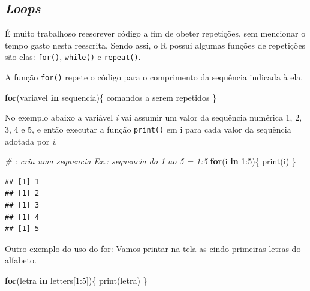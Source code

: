 \documentclass[
]{book}
\newenvironment{Shaded}{\begin{snugshade}}{\end{snugshade}}
\newcommand{\CommentTok}[1]{\textcolor[rgb]{0.56,0.35,0.01}{\textit{#1}}}
\newcommand{\ControlFlowTok}[1]{\textcolor[rgb]{0.13,0.29,0.53}{\textbf{#1}}}
\newcommand{\DecValTok}[1]{\textcolor[rgb]{0.00,0.00,0.81}{#1}}
\newcommand{\FunctionTok}[1]{\textcolor[rgb]{0.00,0.00,0.00}{#1}}
\newcommand{\NormalTok}[1]{#1}
\newcommand{\SpecialCharTok}[1]{\textcolor[rgb]{0.00,0.00,0.00}{#1}}
\theoremstyle{definition}
\theoremstyle{definition}
\theoremstyle{definition}
\theoremstyle{definition}
\theoremstyle{remark}
\begin{document}
\hypertarget{loops}{%
\subsection{\texorpdfstring{\emph{Loops}}{Loops}}\label{loops}}

É muito trabalhoso reescrever código a fim de obeter repetições, sem mencionar o tempo gasto nesta reescrita. Sendo assi, o R possui algumas funções de repetições são elas: \texttt{for()}, \texttt{while()} e \texttt{repeat()}.

A função \texttt{for()} repete o código para o comprimento da sequência indicada à ela.

\begin{Shaded}
\begin{Highlighting}[]
\ControlFlowTok{for}\NormalTok{(variavel }\ControlFlowTok{in}\NormalTok{ sequencia)\{}
\NormalTok{  comandos a serem repetidos}
\NormalTok{\}}
\end{Highlighting}
\end{Shaded}

No exemplo abaixo a variável \emph{i} vai assumir um valor da sequência numérica 1, 2, 3, 4 e 5, e então executar a função \texttt{print()} em i para cada valor da sequência adotada por \emph{i}.

\begin{Shaded}
\begin{Highlighting}[]
\CommentTok{\# : cria uma sequencia Ex.: sequencia do 1 ao 5 = 1:5}
\ControlFlowTok{for}\NormalTok{(i }\ControlFlowTok{in} \DecValTok{1}\SpecialCharTok{:}\DecValTok{5}\NormalTok{)\{ }
  \FunctionTok{print}\NormalTok{(i)}
\NormalTok{\}}
\end{Highlighting}
\end{Shaded}

\begin{verbatim}
## [1] 1
## [1] 2
## [1] 3
## [1] 4
## [1] 5
\end{verbatim}

Outro exemplo do uso do for: Vamos printar na tela as cindo primeiras letras do alfabeto.

\begin{Shaded}
\begin{Highlighting}[]
\ControlFlowTok{for}\NormalTok{(letra }\ControlFlowTok{in}\NormalTok{ letters[}\DecValTok{1}\SpecialCharTok{:}\DecValTok{5}\NormalTok{])\{}
  \FunctionTok{print}\NormalTok{(letra)}
\NormalTok{\}}
\end{Highlighting}
\end{Shaded}
\end{document}
